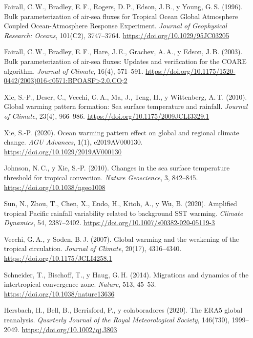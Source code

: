 \documentclass[12pt, letterpaper]{article}
\begin{document}
	\noindent [11] Fairall, C.\,W., Bradley, E.\,F., Rogers, D.\,P., Edson, J.\,B., y Young,
	G.\,S. (1996). Bulk parameterization of air-sea fluxes for Tropical Ocean Global Atmosphere
	Coupled Ocean-Atmosphere Response Experiment. \textit{Journal of Geophysical Research:
		Oceans}, 101(C2), 3747--3764.
	\url{https://doi.org/10.1029/95JC03205}
	
	\noindent [12] Fairall, C.\,W., Bradley, E.\,F., Hare, J.\,E., Grachev, A.\,A., y Edson,
	J.\,B. (2003). Bulk parameterization of air-sea fluxes: Updates and verification for the
	COARE algorithm. \textit{Journal of Climate}, 16(4), 571--591.
	\url{https://doi.org/10.1175/1520-0442(2003)016<0571:BPOASF>2.0.CO;2}
	
	\noindent [13] Xie, S.-P., Deser, C., Vecchi, G.\,A., Ma, J., Teng, H., y Wittenberg,
	A.\,T. (2010). Global warming pattern formation: Sea surface temperature and rainfall.
	\textit{Journal of Climate}, 23(4), 966--986.
	\url{https://doi.org/10.1175/2009JCLI3329.1}
	
	\noindent [14] Xie, S.-P. (2020). Ocean warming pattern effect on global and regional
	climate change. \textit{AGU Advances}, 1(1), e2019AV000130.
	\url{https://doi.org/10.1029/2019AV000130}
	
	\noindent [15] Johnson, N.\,C., y Xie, S.-P. (2010). Changes in the sea surface temperature
	threshold for tropical convection. \textit{Nature Geoscience}, 3, 842--845.
	\url{https://doi.org/10.1038/ngeo1008}
	
	\noindent [16] Sun, N., Zhou, T., Chen, X., Endo, H., Kitoh, A., y Wu, B. (2020).
	Amplified tropical Pacific rainfall variability related to background SST warming.
	\textit{Climate Dynamics}, 54, 2387--2402.
	\url{https://doi.org/10.1007/s00382-020-05119-3}
	
	\noindent [17] Vecchi, G.\,A., y Soden, B.\,J. (2007). Global warming and the weakening of
	the tropical circulation. \textit{Journal of Climate}, 20(17), 4316--4340.
	\url{https://doi.org/10.1175/JCLI4258.1}
	
	\noindent [18] Schneider, T., Bischoff, T., y Haug, G.\,H. (2014). Migrations and dynamics
	of the intertropical convergence zone. \textit{Nature}, 513, 45--53.
	\url{https://doi.org/10.1038/nature13636}
	
	\noindent [19] Hersbach, H., Bell, B., Berrisford, P., y colaboradores (2020). The ERA5
	global reanalysis. \textit{Quarterly Journal of the Royal Meteorological Society}, 146(730),
	1999--2049.
	\url{https://doi.org/10.1002/qj.3803}
	
\end{document}
